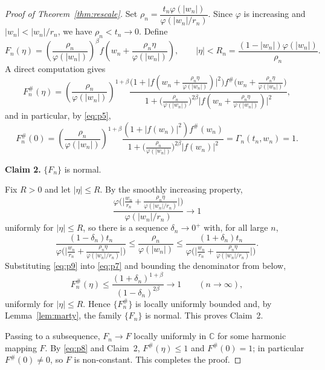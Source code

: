 \documentclass[11pt,reqno]{amsart}
\theoremstyle{definition}
\newcommand{\C}{\mathbb{C}}
\begin{document}
\begin{proof}[Proof of Theorem~\textup{\ref{thm:rescale}}]
Set $\rho_{n}=\dfrac{t_{n}\varphi(|w_{n}|)}{\varphi(|w_{n}|/r_{n})}$. Since $\varphi$ is
increasing and $|w_{n}|<|w_{n}|/r_{n}$, we have $\rho_{n}<t_{n}\to0$. Define
\[
F_{n}(\eta)=\left(\frac{\rho_{n}}{\varphi(|w_{n}|)}\right)^{\beta}
f\!\left(w_{n}+\frac{\rho_{n}\eta}{\varphi(|w_{n}|)}\right),
\qquad |\eta|<R_{n}=\frac{(1-|w_{n}|)\varphi(|w_{n}|)}{\rho_{n}}.
\]
A direct computation gives
\begin{equation}\label{eq:p7}
F_{n}^{\#}(\eta)=\left(\frac{\rho_{n}}{\varphi(|w_{n}|)}\right)^{1+\beta}
\frac{\Big(1+\big|f(w_{n}+\tfrac{\rho_{n}\eta}{\varphi(|w_{n}|)})\big|^{2}\Big)
f^{\#}\!\big(w_{n}+\tfrac{\rho_{n}\eta}{\varphi(|w_{n}|)}\big)}
{1+\big(\tfrac{\rho_{n}}{\varphi(|w_{n}|)}\big)^{2\beta}
\big|f(w_{n}+\tfrac{\rho_{n}\eta}{\varphi(|w_{n}|)})\big|^{2}},
\end{equation}
and in particular, by \eqref{eq:p5},
\begin{equation}\label{eq:p8}
F_{n}^{\#}(0)=\left(\frac{\rho_{n}}{\varphi(|w_{n}|)}\right)^{1+\beta}
\frac{(1+|f(w_{n})|^{2})f^{\#}(w_{n})}
{1+\big(\tfrac{\rho_{n}}{\varphi(|w_{n}|)}\big)^{2\beta}|f(w_{n})|^{2}}
=\Gamma_{n}(t_{n},w_{n})=1.
\end{equation}

\smallskip
\noindent\textbf{Claim 2.} $\{F_{n}\}$ is normal.

\smallskip
Fix $R>0$ and let $|\eta|\le R$. By the smoothly increasing property,
\[
\frac{\varphi\!\Big(\big|\tfrac{w_{n}}{r_{n}}+\tfrac{\rho_{n}\eta}
{\varphi(|w_{n}|/r_{n})}\big|\Big)}{\varphi(|w_{n}|/r_{n})}\longrightarrow1
\]
uniformly for $|\eta|\le R$, so there is a sequence $\delta_{n}\to0^{+}$ with, for all large
$n$,
\begin{equation}\label{eq:p9}
\frac{(1-\delta_{n})t_{n}}
{\varphi\!\big(\big|\tfrac{w_{n}}{r_{n}}+\tfrac{\rho_{n}\eta}{\varphi(|w_{n}|/r_{n})}\big|\big)}
\le\frac{\rho_{n}}{\varphi(|w_{n}|)}
\le\frac{(1+\delta_{n})t_{n}}
{\varphi\!\big(\big|\tfrac{w_{n}}{r_{n}}+\tfrac{\rho_{n}\eta}{\varphi(|w_{n}|/r_{n})}\big|\big)}.
\end{equation}
Substituting \eqref{eq:p9} into \eqref{eq:p7} and bounding the denominator from below,
\[
F_{n}^{\#}(\eta)\le\frac{(1+\delta_{n})^{1+\beta}}{(1-\delta_{n})^{2\beta}}
\longrightarrow1\qquad(n\to\infty),
\]
uniformly for $|\eta|\le R$. Hence $\{F_{n}^{\#}\}$ is locally uniformly bounded and, by
Lemma~\ref{lem:marty}, the family $\{F_{n}\}$ is normal. This proves Claim~2.

\smallskip
Passing to a subsequence, $F_{n}\to F$ locally uniformly in $\C$ for some harmonic mapping
$F$. By \eqref{eq:p8} and Claim~2, $F^{\#}(\eta)\le1$ and $F^{\#}(0)=1$; in particular
$F^{\#}(0)\neq0$, so $F$ is non-constant. This completes the proof.
\end{proof}
\end{document}
